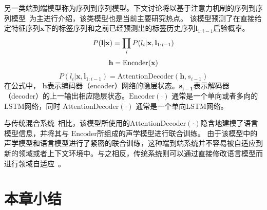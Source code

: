 另一类端到端模型称为序列到序列模型。下文讨论将以基于注意力机制的序列到序列模型~\cite{chan2016end}为主进行介绍，该类模型也是当前主要研究热点。
该模型预测了在直接给定特征序列$\mathbf{x}$下的标签序列和之前已经预测出的标签历史序列$\mathbf{l}_{1:i-1}$后验概率。
\begin{equation}
\vspace{-0.6em}  
\label{equ:enc-dec}
\begin{split}
P(\mathbf{l}|\mathbf{x})=\prod_i P(l_{i}|\mathbf{x},\mathbf{l}_{1:i-1})
\end{split}
\end{equation}
\begin{equation}
\label{equ:enc-dec-hid}
\begin{split}
\mathbf{h}&=\text{Encoder}(\mathbf{x})\\
\end{split}
\vspace{-0.3em}  
\end{equation}
\begin{equation}
\label{equ:enc-dec-dec}
P(l_{i}|\mathbf{x},\mathbf{l}_{1:i-1})=\text{AttentionDecoder}(\mathbf{h}, s_{i-1})
\end{equation}
在公式中， $\mathbf{h}$表示编码器（encoder）网络的隐层状态。$\mathbf{s_{i-1}}$表示解码器（decoder）的上一输出相应隐层状态。$\text{Encoder}(\cdot)$ 通常是一个单向或者多向的LSTM网络，同时 $\text{AttentionDecoder}(\cdot)$ 通常是一个单向LSTM网络。 %

与传统混合系统~\cite{hinton2012deep}相比，该模型所使用的$\text{AttentionDecoder}(\cdot)$隐含地建模了语言模型信息，并将其与 $\text{Encoder}$所组成的声学模型进行联合训练。
%
%
%
由于该模型中的声学模型和语言模型进行了紧密的联合训练，这种端到端系统并不容易被自适应到新的领域或者上下文环境中。与之相反，传统系统则可以通过直接修改语言模型而进行领域自适应~\cite{mcgraw2016personalized}。 


\section{本章小结}
\label{chap:intro-sum}

